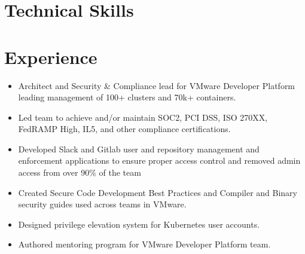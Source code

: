 \documentclass[10pt,a4paper,roman]{moderncv} %
\begin{document}


\makecvtitle %


\section{Technical Skills}




\section{Experience}
{
\begin{itemize}
\item Architect and Security \& Compliance lead for VMware Developer Platform leading management of 100+ clusters and 70k+ containers.
\item Led team to achieve and/or maintain SOC2, PCI DSS, ISO 270XX, FedRAMP High, IL5, and other compliance certifications.
\item Developed Slack and Gitlab user and repository management and enforcement applications to ensure proper access control and removed admin access from over 90\% of the team
\item Created Secure Code Development Best Practices and Compiler and Binary security guides used across teams in VMware.
\item Designed privilege elevation system for Kubernetes user accounts.
\item Authored mentoring program for VMware Developer Platform team.
\end{itemize}
}
\end{document}
